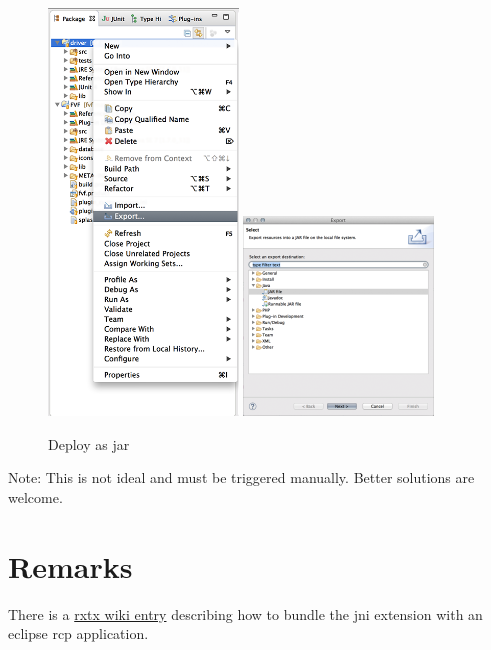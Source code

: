 \begin{figure}[H]
	\includegraphics[width=0.45\textwidth]{images/driver_export.png}
	\includegraphics[width=0.45\textwidth]{images/driver_export_dialog.png}
	\caption{Deploy as jar}
	\label{fig:deployment-driver}
\end{figure}

Note: This is not ideal and must be triggered manually. Better solutions are welcome.


\section{Remarks}
\label{source/driver:remarks}
There is a \href{http://rxtx.qbang.org/wiki/index.php/Wrapping\_RXTX\_in\_an\_Eclipse\_Plugin}{rxtx wiki entry} describing how to bundle the jni extension with an eclipse rcp application.


